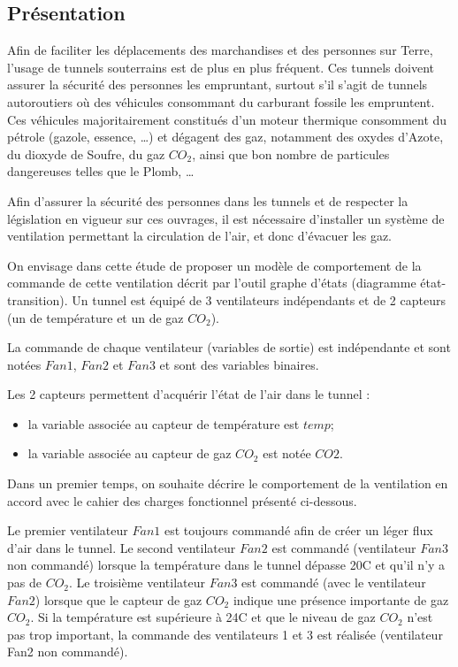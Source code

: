 \documentclass[10pt]{article}
\begin{document}
\subsection*{Présentation}
Afin de faciliter les déplacements des marchandises et des personnes sur Terre, l’usage de
tunnels souterrains est de plus en plus fréquent. Ces tunnels doivent assurer la sécurité des
personnes les empruntant, surtout s’il s’agit de tunnels autoroutiers où des véhicules
consommant du carburant fossile les empruntent. Ces véhicules majoritairement constitués
d’un moteur thermique consomment du pétrole (gazole, essence, …) et dégagent des gaz,
notamment des oxydes d’Azote, du dioxyde de Soufre, du gaz $CO_2$, ainsi que bon nombre de
particules dangereuses telles que le Plomb, …

Afin d’assurer la sécurité des personnes dans les tunnels et de respecter la législation en vigueur
sur ces ouvrages, il est nécessaire d’installer un système de ventilation permettant la circulation
de l’air, et donc d’évacuer les gaz.

On envisage dans cette étude de proposer un modèle de comportement de la commande de cette
ventilation décrit par l’outil graphe d’états (diagramme état-transition). Un tunnel est équipé de
3 ventilateurs indépendants et de 2 capteurs (un de température et un de gaz $CO_2$).

La commande de chaque ventilateur (variables de sortie) est indépendante et sont notées
$Fan1$, $Fan2$ et $Fan3$ et sont des variables binaires.

Les 2 capteurs permettent d’acquérir l’état de l’air dans le tunnel :
\begin{itemize}
\item la variable associée au capteur de température est $temp$;
\item la variable associée au capteur de gaz $CO_2$ est notée $CO2$.
\end{itemize}

Dans un premier temps, on souhaite décrire le comportement de la ventilation en accord avec le cahier
des charges fonctionnel présenté ci-dessous.

Le premier ventilateur $Fan1$ est toujours commandé afin de créer un léger flux d’air dans le
tunnel. Le second ventilateur $Fan2$ est commandé (ventilateur $Fan3$ non commandé) lorsque la
température dans le tunnel dépasse 20\textdegree C et qu’il n’y a pas de $CO_2$. Le troisième ventilateur $Fan3$
est commandé (avec le ventilateur $Fan2$) lorsque que le capteur de gaz $CO_2$ indique une
présence importante de gaz $CO_2$. Si la température est supérieure à 24\textdegree C et que le niveau de gaz
$CO_2$ n’est pas trop important, la commande des ventilateurs 1 et 3 est réalisée (ventilateur Fan2
non commandé).
\end{document}
